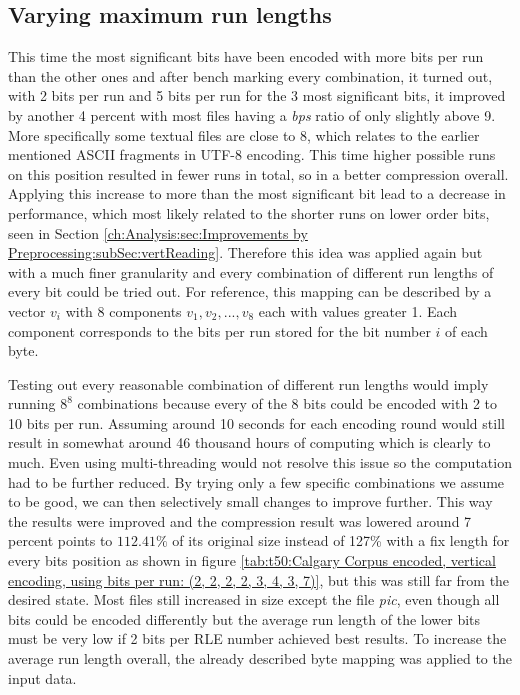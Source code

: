 \subsection{Varying maximum run lengths}
\label{ch:Conceptual Design:sec:var lengths}
\par{
This time the most significant bits have been encoded with more bits per run than the other ones and after bench marking every combination, it turned out, with 2 bits per run and 5 bits per run for the 3 most significant bits, it improved by another 4 percent with most files having a \textit{bps} ratio of only slightly above 9. More specifically some textual files are close to 8, which relates to the earlier mentioned ASCII fragments in UTF-8 encoding. This time higher possible runs on this position resulted in fewer runs in total, so in a better compression overall. Applying this increase to more than the most significant bit lead to a decrease in performance, which most likely related to the shorter runs on lower order bits, seen in Section \ref{ch:Analysis:sec:Improvements by Preprocessing:subSec:vertReading}. Therefore this idea was applied again but with a much finer granularity and every combination of different run lengths of every bit could be tried out. For reference, this mapping can be described by a vector $v_i$ with 8 components $v_1,v_2,...,v_8$ each with values greater 1. Each component corresponds to the bits per run stored for the bit number $i$ of each byte.
}
\par{
Testing out every reasonable combination of different run lengths would imply running $8^8$ combinations because every of the 8 bits could be encoded with 2 to 10 bits per run. Assuming around 10 seconds for each encoding round would still result in somewhat around 46 thousand hours of computing which is clearly to much. Even using multi-threading would not resolve this issue so the computation had to be further reduced. By trying only a few specific combinations we assume to be good, we can then selectively small changes to improve further. This way the results were improved and the compression result was lowered around 7 percent points to $112.41\%$ of its original size instead of 127\% with a fix length for every bits position as shown in figure \ref{tab:t50:Calgary Corpus encoded, vertical encoding, using bits per run: (2, 2, 2, 2, 3, 4, 3, 7)}, but this was still far from the desired state. Most files still increased in size except the file \textit{pic}, even though all bits could be encoded differently but the average run length of the lower bits must be very low if 2 bits per RLE number achieved best results. To increase the average run length overall, the already described byte mapping was applied to the input data.
}
